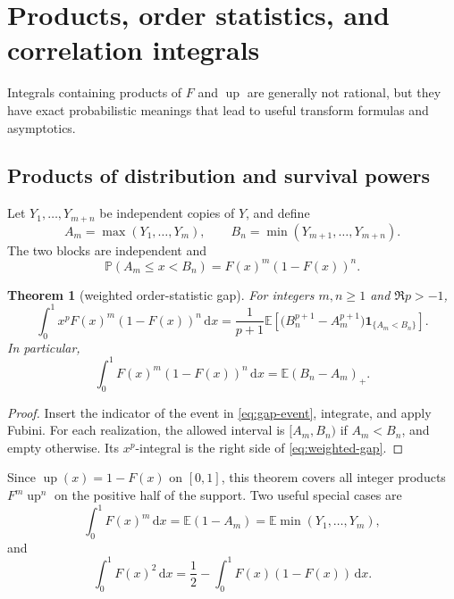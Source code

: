 \documentclass[11pt,oneside]{article}
\newtheorem{theorem}{Theorem}[section]
\theoremstyle{definition}
\newcommand{\F}{F}
\newcommand{\upf}{\operatorname{up}}
\newcommand{\E}{\mathbb E}
\newcommand{\Prob}{\mathbb P}
\newcommand{\dd}{\,\mathrm d}
\newcommand{\ind}{\mathbf 1}
\begin{document}
\section{Products, order statistics, and correlation integrals}

Integrals containing products of \(\F\) and \(\upf\) are generally not rational, but
they have exact probabilistic meanings that lead to useful transform formulas and
asymptotics.

\subsection{Products of distribution and survival powers}

Let \(Y_1,\ldots,Y_{m+n}\) be independent copies of \(Y\), and define
\begin{equation}\label{eq:Amax-Bmin}
 A_m=\max(Y_1,\ldots,Y_m),
 \qquad
 B_n=\min(Y_{m+1},\ldots,Y_{m+n}).
\end{equation}
The two blocks are independent and
\begin{equation}\label{eq:gap-event}
 \Prob(A_m\le x<B_n)=\F(x)^m(1-\F(x))^n.
\end{equation}

\begin{theorem}[weighted order-statistic gap]\label{thm:order-gap}
For integers \(m,n\ge1\) and \(\Re p>-1\),
\begin{equation}\label{eq:weighted-gap}
 \int_0^1x^p\F(x)^m(1-\F(x))^n\dd x
 =\frac1{p+1}\E\left[
 \bigl(B_n^{p+1}-A_m^{p+1}\bigr)\ind_{\{A_m<B_n\}}
 \right].
\end{equation}
In particular,
\begin{equation}\label{eq:gap-unweighted}
 \int_0^1\F(x)^m(1-\F(x))^n\dd x
 =\E(B_n-A_m)_+.
\end{equation}
\end{theorem}

\begin{proof}
Insert the indicator of the event in \cref{eq:gap-event}, integrate, and apply Fubini.
For each realization, the allowed interval is \([A_m,B_n)\) if \(A_m<B_n\), and empty
otherwise.  Its \(x^p\)-integral is the right side of \cref{eq:weighted-gap}.
\end{proof}

Since \(\upf(x)=1-\F(x)\) on \([0,1]\), this theorem covers all integer products
\(\F^m\upf^n\) on the positive half of the support.  Two useful special cases are
\begin{equation}\label{eq:Fm-order}
 \int_0^1\F(x)^m\dd x=\E(1-A_m)=\E\min(Y_1,\ldots,Y_m),
\end{equation}
and
\begin{equation}\label{eq:F2-gini-relation}
 \int_0^1\F(x)^2\dd x
 =\frac12-\int_0^1\F(x)(1-\F(x))\dd x.
\end{equation}
\end{document}
